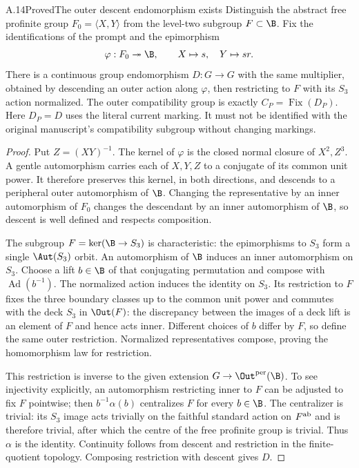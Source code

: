 \begin{statement}{A.14}{Proved}{The outer descent endomorphism exists}
Distinguish the abstract free profinite group $F_0=\langle X,Y\rangle$
from the level-two subgroup $F\subset\B$. Fix the identifications
of the prompt and the epimorphism
\[
 \varphi:F_0\twoheadrightarrow\B,
 \qquad X\mapsto s,\quad Y\mapsto sr.
\]
There is a continuous group endomorphism $D:G\to G$ with the
same multiplier, obtained by descending an outer action along
$\varphi$, then restricting to $F$ with its $S_3$ action
normalized. The outer compatibility group is exactly
$C_P=\operatorname{Fix}(D_P)$. Here $D_P=D$ uses the literal
current marking. It must not be identified with the original
manuscript's compatibility subgroup without changing markings.
\end{statement}
\begin{proof}
Put $Z=(XY)^{-1}$. The kernel of $\varphi$ is the closed
normal closure of $X^2,Z^3$. A gentle automorphism carries
each of $X,Y,Z$ to a conjugate of its common unit power.
It therefore preserves this kernel, in both directions, and
descends to a peripheral outer automorphism of $\B$.
Changing the representative by an inner automorphism of
$F_0$ changes the descendant by an inner automorphism of
$\B$, so descent is well defined and respects composition.

The subgroup $F=\ker(\B\to S_3)$ is characteristic:
the epimorphisms to $S_3$ form a single $\Aut(S_3)$ orbit.
An automorphism of $\B$ induces an inner automorphism on
$S_3$. Choose a lift $b\in\B$ of that conjugating
permutation and compose with $\operatorname{Ad}(b^{-1})$.
The normalized action induces the identity on $S_3$.
Its restriction to $F$ fixes the three boundary classes
up to the common unit power and commutes with the deck
$S_3$ in $\Out(F)$: the discrepancy between the images
of a deck lift is an element of $F$ and hence acts inner.
Different choices of $b$ differ by $F$, so define the
same outer restriction. Normalized representatives compose,
proving the homomorphism law for restriction.

This restriction is inverse to the given extension
$G\to\Out^{\rm per}(\B)$. To see injectivity explicitly,
an automorphism restricting inner to $F$ can be adjusted
to fix $F$ pointwise; then $b^{-1}\alpha(b)$ centralizes
$F$ for every $b\in\B$. The centralizer is trivial:
its $S_3$ image acts trivially on the faithful standard
action on $F^{\rm ab}$ and is therefore trivial, after
which the centre of the free profinite group is trivial.
Thus $\alpha$ is the identity. Continuity follows from
descent and restriction in the finite-quotient topology.
Composing restriction with descent gives $D$.


\end{proof}
